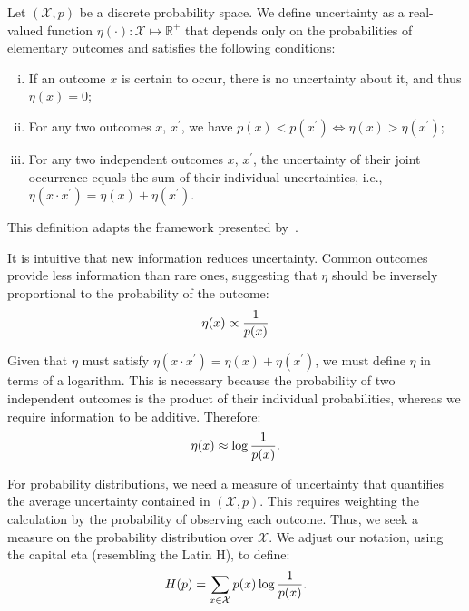 \begin{definition}
	Let $(\mathcal{X}, p)$ be a discrete probability space. We define
	\textnormal{\sffamily uncertainty} as a real-valued function
	$\eta(\cdot): \mathcal{X} \mapsto \mathbb{R}^+$ that depends only on the
	probabilities of elementary outcomes and satisfies the following conditions:
	\begin{enumerate}[(i)]
		\item If an outcome $x$ is certain to occur, there is no uncertainty about it, and thus $\eta(x) = 0$;
		\item For any two outcomes $x$, $x^\prime$, we have $p(x) < p(x^\prime) \iff
			      \eta(x) > \eta(x^\prime)$;
		\item For any two independent outcomes $x$, $x^\prime$, the
		      uncertainty of their joint occurrence equals the sum of their
		      individual uncertainties, i.e.,
		      $\eta(x \cdot x^\prime) = \eta(x) + \eta(x^\prime)$.
	\end{enumerate}
\end{definition}
\begin{remark}
	This definition adapts the framework presented by~\cite{ref:martin-2011}.
\end{remark}

It is intuitive that new information reduces uncertainty. Common outcomes provide less information than rare ones, suggesting that $\eta$ should be inversely proportional to the probability of the outcome:
\begin{align}
	\label{eq:eta-1}
	\eta(x) \propto {1 \over p(x)}
\end{align}

Given that $\eta$ must satisfy $\eta(x \cdot x^\prime) = \eta(x) + \eta(x^\prime)$, we must define $\eta$ in terms of a logarithm. This is necessary because the probability of two independent outcomes is the product of their individual probabilities, whereas we require information to be additive. Therefore:
\begin{align}
	\label{eq:eta-3}
	\eta(x) \approx \log{1 \over p(x)}.
\end{align}

For probability distributions, we need a measure of uncertainty that quantifies the average uncertainty contained in $(\mathcal{X}, p)$. This requires weighting the calculation by the probability of observing each outcome. Thus, we seek a measure on the probability distribution over $\mathcal{X}$. We adjust our notation, using the capital eta (resembling the Latin H), to define:
\begin{align}
	\label{eq:eta-almost}
	H(p) = \sum_{x \in \mathcal{X}} p(x) \log{1 \over p(x)}.
\end{align}

